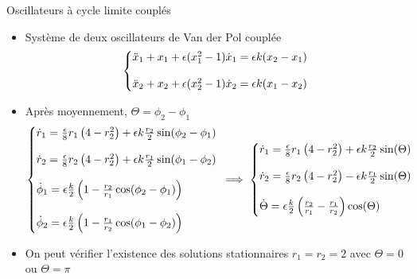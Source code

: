 \begin{frame}{Oscillateurs à cycle limite couplés}
  \begin{itemize}
    \item Système de deux oscillateurs de Van der Pol couplée
    \begin{equation*}
      \left\{\begin{array}{@{}l@{}}
      \ddot{x}_1 + x_1  + \epsilon(x_1^2 - 1)\dot{x}_1 = \epsilon k(x_2 - x_1) \\
      \\
      \ddot{x}_2 + x_2 + \epsilon(x_2^2 - 1)\dot{x}_2 = \epsilon k(x_1 - x_2)
    \end{array}\right.\, 
    \end{equation*}
    \item Après moyennement, $\Theta = \phi_2 - \phi_1$
    \tiny
    \begin{equation*}
      \left\{\begin{array}{@{}l@{}}
        \dot{r}_1 =  \frac{\epsilon}{8} r_1 \left( 4 - r_2^2 \right) + \epsilon k\frac{r_2}{2}\sin(\phi_2 - \phi_1)\\
        \\
        \dot{r}_2 =  \frac{\epsilon}{8} r_2 \left( 4 - r_2^2 \right) + \epsilon k\frac{r_1}{2}\sin(\phi_1 - \phi_2)\\
        \\
        \dot{\phi}_1 = \epsilon \frac{k}{2}\left( 1 - \frac{r_2}{r_1}\cos(\phi_2 - \phi_1)\right) \\
        \\
        \dot{\phi}_2 = \epsilon \frac{k}{2}\left( 1 - \frac{r_1}{r_2}\cos(\phi_1 - \phi_2)\right)
    \end{array}\right.\,
    \implies
      \left\{\begin{array}{@{}l@{}}
        \dot{r}_1 = \frac{\epsilon}{8} r_1 \left( 4 - r_2^2 \right) + \epsilon k\frac{r_2}{2}\sin(\Theta)\\
        \\
        \dot{r}_2 = \frac{\epsilon}{8} r_2 \left( 4 - r_2^2 \right) - \epsilon k\frac{r_1}{2}\sin(\Theta) \\
        \\
      \dot{\Theta} = \epsilon \frac{k}{2}\left(  \frac{r_2}{r_1} - \frac{r_1}{r_2} \right)\cos(\Theta)
    \end{array}\right.\,
    \end{equation*}
    \small
    \item On peut vérifier l'existence des solutions stationnaires $r_1=r_2=2$ avec $\Theta=0$ ou $\Theta=\pi$
  \end{itemize}
\end{frame}


